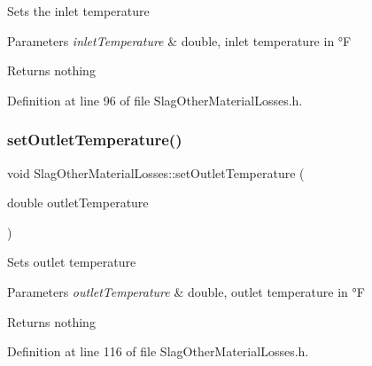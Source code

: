 Sets the inlet temperature


\begin{DoxyParams}{Parameters}
{\em inlet\+Temperature} & double, inlet temperature in °F\\
\hline
\end{DoxyParams}
\begin{DoxyReturn}{Returns}
nothing 
\end{DoxyReturn}


Definition at line 96 of file Slag\+Other\+Material\+Losses.\+h.

\mbox{\label{class_slag_other_material_losses_afae6aafff94d02926135fabf20a87070}} 
\subsubsection{\texorpdfstring{set\+Outlet\+Temperature()}{setOutletTemperature()}\hspace{0.1cm}{\footnotesize\ttfamily [1/3]}}
{\footnotesize\ttfamily void Slag\+Other\+Material\+Losses\+::set\+Outlet\+Temperature (\begin{DoxyParamCaption}\item[{double}]{outlet\+Temperature }\end{DoxyParamCaption})\hspace{0.3cm}{\ttfamily [inline]}}

Sets outlet temperature


\begin{DoxyParams}{Parameters}
{\em outlet\+Temperature} & double, outlet temperature in °F\\
\hline
\end{DoxyParams}
\begin{DoxyReturn}{Returns}
nothing 
\end{DoxyReturn}


Definition at line 116 of file Slag\+Other\+Material\+Losses.\+h.

\mbox{\label{class_slag_other_material_losses_afae6aafff94d02926135fabf20a87070}} 

